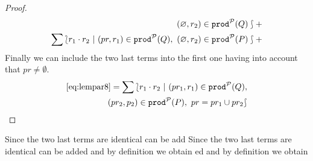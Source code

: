 \begin{proof}
\begin{equation}
\begin{split}
        (\varnothing,r_{2})\in\mathtt{prod}^{\cal P}(Q)\rbag+\\
        \sum\lbag  r_{1}\cdot r_{2}\ |\
        (pr,r_{1})\in\mathtt{prod}^{\cal P}(Q),\
        (\varnothing,r_{2})\in\mathtt{prod}^{\cal P}(P)\rbag+\\
      \end{split}
    \end{equation}
    Finally we can include the two last terms into the first one
    having into account that $pr\neq\emptyset$.
    \begin{equation}\label{eq:lempar9}
      \begin{split}
        \eqref{eq:lempar8} =
        \sum\lbag r_{1}\cdot r_{2}\ |\ (pr_{1},r_{1})\in\mathtt{prod}^{\cal P}(Q),\\ (pr_{2},p_{2})\in\mathtt{prod}^{\cal P}(P),\
        pr = pr_{1}\cup pr_{2}\rbag
      \end{split}
    \end{equation}
  \end{proof}
\elem


    Since the two last terms are identical can be add    Since the two last terms are identical can be added and by
    definition we obtain
ed and by
    definition we obtain

